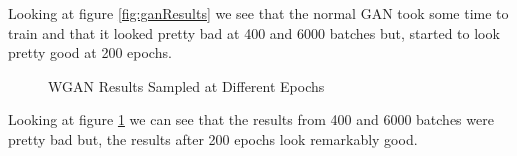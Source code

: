 \documentclass[12pt,
 reprint,
 amsmath,amssymb,
 aps,
]{revtex4-2}
\begin{document}
Looking at figure \ref{fig:ganResults} we see that the normal GAN took some time to train and that it looked pretty bad at 400 and 6000 batches but, started to look pretty good at 200 epochs. 


\begin{figure}[h!]
    \centering
    \qquad
    \qquad
    \caption{WGAN Results Sampled at Different Epochs}%
    \label{fig:wganResults}%
\end{figure}

Looking at figure \ref{fig:wganResults} we can see that the results from 400 and 6000 batches were pretty bad but, the results after 200 epochs look remarkably good.
\end{document}
